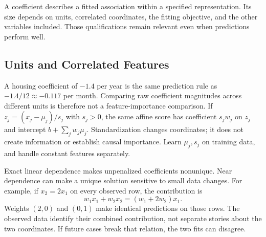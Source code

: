 A coefficient describes a fitted association within a specified representation. Its size depends on units, correlated coordinates, the fitting objective, and the other variables included. Those qualifications remain relevant even when predictions perform well.

\subsection{Units and Correlated Features}

A housing coefficient of $-1.4$ per year is the same prediction rule as $-1.4/12\approx-0.117$ per month. Comparing raw coefficient magnitudes across different units is therefore not a feature-importance comparison. If $z_j=(x_j-\mu_j)/s_j$ with $s_j>0$, the same affine score has coefficient $s_jw_j$ on $z_j$ and intercept $b+\sum_jw_j\mu_j$. Standardization changes coordinates; it does not create information or establish causal importance. Learn $\mu_j,s_j$ on training data, and handle constant features separately.

Exact linear dependence makes unpenalized coefficients nonunique. Near dependence can make a unique solution sensitive to small data changes. For example, if $x_2=2x_1$ on every observed row, the contribution is
\[
w_1x_1+w_2x_2=(w_1+2w_2)x_1.
\]
Weights $(2,0)$ and $(0,1)$ make identical predictions on those rows. The observed data identify their combined contribution, not separate stories about the two coordinates. If future cases break that relation, the two fits can disagree.

\par\addvspace{\intextsep}\noindent\begin{minipage}{\linewidth}
\centering
{}
\label{fig:correlated-feature-instability}
\end{minipage}\par\addvspace{\intextsep}

